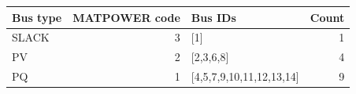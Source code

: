 \begin{tabular}{l r l r}\toprule
Bus type & MATPOWER code & Bus IDs & Count \\ \midrule
SLACK & 3 & {[1]} & 1 \\ 
PV & 2 & {[2,3,6,8]} & 4 \\ 
PQ & 1 & {[4,5,7,9,10,11,12,13,14]} & 9 \\ 
\bottomrule\end{tabular}
